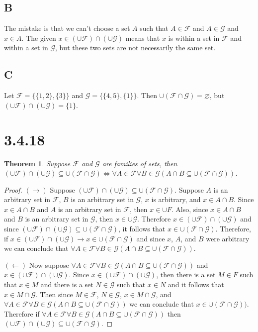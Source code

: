 \documentclass{article}
\newcommand{\F}{\mathcal{F}}
\newcommand{\G}{\mathcal{G}}
\newtheorem*{theorem}{Theorem}  %
\begin{document}
\subsection*{B}
The mistake is that we can't choose a set $A$ such that $A \in \F$ and $A \in \G$ and $x \in A$. The given $x \in (\cup \F) \cap (\cup \G)$ means that $x$ is within a set in $\F$ and within a set in $\G$, but these two sets are not necessarily the same set.

\subsection*{C}
Let $\F = \{\{1,2\}, \{3\}\}$ and $\G = \{\{4,5\}, \{1\}\}$. Then $\cup (\F \cap \G) = \varnothing$, but $(\cup \F) \cap (\cup \G) = \{1\}$.


\section*{3.4.18}
\begin{theorem} Suppose $\F$ and $\G$ are families of sets, then $(\cup \F) \cap (\cup \G) \subseteq \cup (\F \cap \G) \iff \forall A \in \F \forall B \in \G (A \cap B \subseteq \cup (\F \cap \G))$.
\end{theorem}
\begin{proof}
$(\rightarrow)$ Suppose $(\cup \F) \cap (\cup \G) \subseteq \cup (\F \cap \G)$. Suppose $A$ is an arbitrary set in $\F$, $B$ is an arbitrary set in $\G$, $x$ is arbitrary, and $x \in A \cap B$. Since $x \in A \cap B$ and $A$ is an arbitrary set in $\F$, then $x \in \cup F$. Also, since $x \in A \cap B$ and $B$ is an arbitrary set in $\G$, then $x \in  \cup \G$. Therefore $x \in (\cup \F) \cap (\cup \G)$ and since $(\cup \F) \cap (\cup \G) \subseteq \cup (\F \cap \G)$, it follows that $x \in \cup (\F \cap \G)$. Therefore, if $x \in (\cup \F) \cap (\cup \G) \rightarrow x \in \cup (\F \cap \G)$ and since $x$, $A$, and $B$ were arbitrary we can conclude that $\forall A \in \F \forall B \in \G (A \cap B \subseteq \cup (\F \cap \G))$.

$(\leftarrow)$ Now suppose $\forall A \in \F \forall B \in \G (A \cap B \subseteq \cup (\F \cap \G))$ and $x \in (\cup \F) \cap (\cup \G)$. Since $x \in (\cup \F) \cap (\cup \G)$, then there is a set $M \in F$ such that $x \in M$ and there is a set $N \in \G$ such that $x \in N$ and it follows that $x \in M \cap \G$. Then since $M \in \F$, $N \in \G$, $x \in M \cap \G$, and $\forall A \in \F \forall B \in \G (A \cap B \subseteq \cup (\F \cap \G))$ we can conclude that $x \in \cup (\F \cap \G))$. Therefore if $\forall A \in \F \forall B \in \G (A \cap B \subseteq \cup (\F \cap \G))$ then $(\cup \F) \cap (\cup \G) \subseteq \cup (\F \cap \G)$.

\end{proof}
\end{document}
